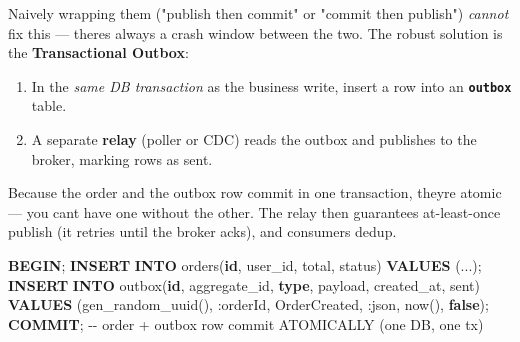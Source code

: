 \documentclass[11pt]{article}
\providecommand{\tightlist}{\setlength{\itemsep}{1pt}\setlength{\parskip}{0pt}}
\newenvironment{Shaded}{\begin{snugshade}}{\end{snugshade}}
\newcommand{\CharTok}[1]{\textcolor[rgb]{0.24,0.68,0.91}{#1}}
\newcommand{\CommentTok}[1]{\textcolor[rgb]{0.48,0.49,0.49}{#1}}
\newcommand{\ControlFlowTok}[1]{\textcolor[rgb]{0.99,0.74,0.29}{\textbf{#1}}}
\newcommand{\KeywordTok}[1]{\textcolor[rgb]{0.81,0.81,0.76}{\textbf{#1}}}
\newcommand{\NormalTok}[1]{\textcolor[rgb]{0.81,0.81,0.76}{#1}}
\newcommand{\OperatorTok}[1]{\textcolor[rgb]{0.81,0.81,0.76}{#1}}
\newcommand{\StringTok}[1]{\textcolor[rgb]{0.96,0.31,0.31}{#1}}
\begin{document}
Naively wrapping them ("publish then commit" or "commit then publish") \emph{cannot} fix this --- there\textquotesingle s always a crash window between the two. The robust solution is the \textbf{Transactional Outbox}:

\begin{enumerate}
\def\labelenumi{\arabic{enumi}.}
\tightlist
\item
  In the \emph{same DB transaction} as the business write, insert a row into an \textbf{\texttt{outbox}} table.
\item
  A separate \textbf{relay} (poller or CDC) reads the outbox and publishes to the broker, marking rows as sent.
\end{enumerate}

Because the order and the outbox row commit in one transaction, they\textquotesingle re atomic --- you can\textquotesingle t have one without the other. The relay then guarantees at-least-once publish (it retries until the broker acks), and consumers dedup.


\begin{Shaded}
\begin{Highlighting}[]
\ControlFlowTok{BEGIN}\NormalTok{;}
  \KeywordTok{INSERT} \KeywordTok{INTO}\NormalTok{ orders(}\KeywordTok{id}\NormalTok{, user\_id, total, status) }\KeywordTok{VALUES}\NormalTok{ (}\OperatorTok{..}\NormalTok{.);}
  \KeywordTok{INSERT} \KeywordTok{INTO}\NormalTok{ outbox(}\KeywordTok{id}\NormalTok{, aggregate\_id, }\KeywordTok{type}\NormalTok{, payload, created\_at, sent)}
         \KeywordTok{VALUES}\NormalTok{ (gen\_random\_uuid(), }\CharTok{:orderId}\NormalTok{, }\StringTok{\textquotesingle{}OrderCreated\textquotesingle{}}\NormalTok{, }\CharTok{:json}\NormalTok{, now(), }\KeywordTok{false}\NormalTok{);}
\KeywordTok{COMMIT}\NormalTok{;   }\CommentTok{{-}{-} order + outbox row commit ATOMICALLY (one DB, one tx)}
\end{Highlighting}
\end{Shaded}

\end{document}
